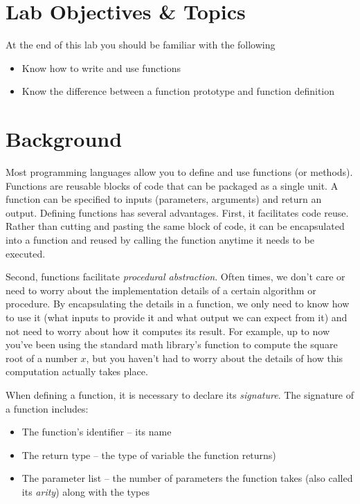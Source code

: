 \documentclass[12pt]{scrartcl}
\begin{document}
\section{Lab Objectives \& Topics}
At the end of this lab you should be familiar with the following
\begin{itemize}
  \item Know how to write and use functions
  \item Know the difference between a function prototype and function definition
\end{itemize}

\section{Background}

Most programming languages allow you to define and use functions 
(or methods).  Functions are reusable blocks of code that can be 
packaged as a single unit.  A function can be specified to inputs 
(parameters, arguments) and return an output.  Defining functions 
has several advantages.  First, it facilitates code reuse.  Rather than 
cutting and pasting the same block of code, it can be encapsulated 
into a function and reused by calling the function anytime it needs 
to be executed.

Second, functions facilitate \emph{procedural abstraction}.  Often 
times, we don't care or need to worry about the implementation 
details of a certain algorithm or procedure.  By encapsulating the 
details in a function, we only need to know how to use it (what 
inputs to provide it and what output we can expect from it) and 
not need to worry about how it computes its result.  For example,
up to now you've been using the standard math library's function
to compute the square root of a number $x$, but you haven't
had to worry about the details of how this computation actually
takes place.

When defining a function, it is necessary to declare its \emph{signature}.  
The signature of a function includes:
\begin{itemize}
  \item The function's identifier -- its name 
  \item The return type -- the type of variable the function returns)
  \item The parameter list -- the number of parameters the function takes 
	(also called its \emph{arity}) along with the types 
\end{itemize}
\end{document}

